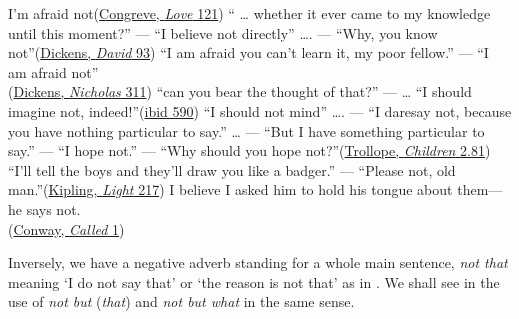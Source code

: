 \ea \label{ex:05-104}
\ea I'm afraid not\hfill(\href{https://archive.org/details/in.ernet.dli.2015.219151/page/n171/mode/2up?q=%22afraid+not%22&view=theater}{Congreve, \textit{Love} 121})
\ex `` {\dots} whether it ever came to my knowledge until this moment?'' --- ``I believe not directly'' {\dots}. --- ``Why, you know not''\hfill(\href{https://archive.org/details/personalhistory05dickgoog/page/n47/mode/2up?q=%22whether+it+ever%22&view=theater}{Dickens, \textit{David} 93}) %
\ex ``I am afraid you can't learn it, my poor fellow.'' --- ``I am afraid not''\\\hfill(\href{https://archive.org/details/lifeadventuresofdickrich/page/330/mode/2up?q=%22you+can%27t+learn+it%22&view=theater}{Dickens, \textit{Nicholas} 311}) %
\ex ``can you bear the thought of that?'' --- {\dots} ``I should imagine not, indeed!''\hfill(\href{https://archive.org/details/lifeadventuresofdickrich/page/616/mode/2up?q=%22bear+the+thought%22&view=theater}{ibid 590}) %
\ex ``I should not mind'' {\dots}. --- ``I daresay not, because you have nothing particular to say.'' {\dots} --- ``But I have something particular to say.'' --- ``I hope not.'' --- ``Why should you hope not?''\hfill(\href{https://archive.org/details/dukeschildrennov00troluoft/page/194/mode/2up?q=%22I+should+not+mind%22&view=theater}{Trollope, \textit{Children} 2.81}) %
\ex ``I'll tell the boys and they'll draw you like a badger.'' --- ``Please not, old man.''\hfill(\href{https://archive.org/details/lightthatfailed0000rudy_q6g8/page/228/mode/2up?q=%22please+not%2C+old+man%22&view=theater}{Kipling, \textit{Light} 217}) %
\ex I believe I asked him to hold his tongue about them---he says not.\\\hfill(\href{https://babel.hathitrust.org/cgi/pt?id=hvd.hnpei8&seq=9&q1=hold+his+tongue}{Conway, \textit{Called} 1}) %
\z
\z
{}

\label{not_that}Inversely, we have a negative adverb standing for a whole main sentence, \textit{not that} meaning `I do not say that' or `the reason is not that' as in . We shall see in  the use of \textit{not but} (\textit{that}) and \textit{not but what} in the same sense.

